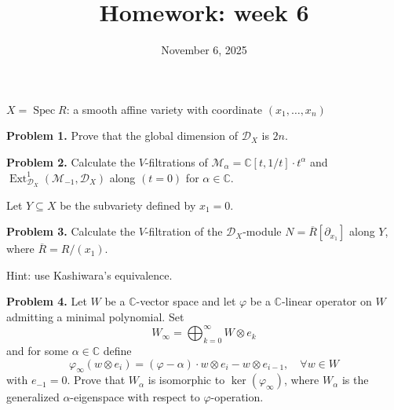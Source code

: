 \documentclass[12pt]{article}
\title{Homework: week 6}
\date{November 6, 2025}
\begin{document}
\maketitle

$X=\operatorname{Spec}R$: a smooth affine variety with coordinate $(x_1,\ldots,x_n)$

\bigskip
\noindent
\textbf{Problem 1.} Prove that the global dimension of $\mathcal{D}_X$ is $2n$.

\bigskip
\noindent
\textbf{Problem 2.} Calculate the $V$-filtrations of $\mathcal{M}_\alpha=\mathbb{C}[t,1/t]\cdot t^\alpha$ and
$\operatorname{Ext}^1_{\mathcal{D}_X}(\mathcal{M}_{-1},\mathcal{D}_X)$ along $(t=0)$ for $\alpha\in \mathbb{C}$.

\bigskip
Let $Y\subseteq X$ be the subvariety defined by $x_1=0$.

\bigskip
\noindent
\textbf{Problem 3.} Calculate the $V$-filtration of the $\mathcal{D}_X$-module $N=\overline{R}[\partial_{x_1}]$ along $Y$, where
$\overline{R}=R/(x_1)$.

\bigskip
\noindent
Hint: use Kashiwara's equivalence.

\bigskip
\noindent
\textbf{Problem 4.} Let $W$ be a $\mathbb{C}$-vector space and let $\varphi$ be a $\mathbb{C}$-linear operator on $W$ admitting
a minimal polynomial. Set
\[
W_\infty=\bigoplus_{k=0}^{\infty} W\otimes e_k
\]
and for some $\alpha\in \mathbb{C}$ define
\[
\varphi_\infty(w\otimes e_i)=(\varphi-\alpha)\cdot w\otimes e_i-w\otimes e_{i-1},\quad \forall w\in W
\]
with $e_{-1}=0$. Prove that $W_\alpha$ is isomorphic to $\ker(\varphi_\infty)$, where $W_\alpha$ is the generalized
$\alpha$-eigenspace with respect to $\varphi$-operation.
\end{document}
